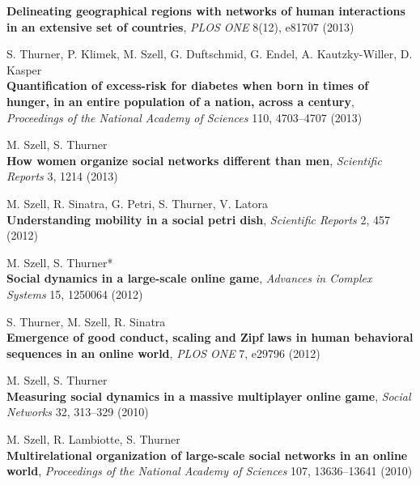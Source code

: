 \documentclass[10pt,a4paper]{article}
\renewenvironment{itemize}{
  \begin{list}{}{
    \setlength{\leftmargin}{1.5em}
    \setlength{\itemsep}{0.25em}
    \setlength{\parskip}{0pt}
    \setlength{\parsep}{0.25em}
  }
}{
  \end{list}
}
\begin{document}
\begin{itemize}
    \textbf{Delineating geographical regions with networks of human interactions in an extensive set of countries}, \textit{PLOS ONE} 8(12), e81707 (2013)
\item S. Thurner, P. Klimek, M. Szell, G. Duftschmid, G. Endel, A. Kautzky-Willer, D. Kasper\\
    \textbf{Quantification of excess-risk for diabetes when born in times of hunger, in an entire population of a nation, across a century}, \textit{Proceedings of the National Academy of Sciences} 110, 4703--4707 (2013)
\item M. Szell, S. Thurner\\
    \textbf{How women organize social networks different than men}, \textit{Scientific Reports} 3, 1214 (2013)
\item M. Szell, R. Sinatra, G. Petri, S. Thurner, V. Latora\\
    \textbf{Understanding mobility in a social petri dish}, \textit{Scientific Reports} 2, 457 (2012)
\item M. Szell, S. Thurner*\\
    \textbf{Social dynamics in a large-scale online game}, \textit{Advances in Complex Systems} 15, 1250064 (2012)
\item S. Thurner, M. Szell, R. Sinatra\\
    \textbf{Emergence of good conduct, scaling and Zipf laws in human behavioral sequences in an online world}, \textit{PLOS ONE} 7, e29796 (2012)
\item M. Szell, S. Thurner\\
    \textbf{Measuring social dynamics in a massive multiplayer online game}, \textit{Social Networks} 32, 313--329 (2010)
\item M. Szell, R. Lambiotte, S. Thurner\\
    \textbf{Multirelational organization of large-scale social networks in an online world}, \textit{Proceedings of the National Academy of Sciences} 107, 13636--13641 (2010)
\end{itemize}
\end{document}
